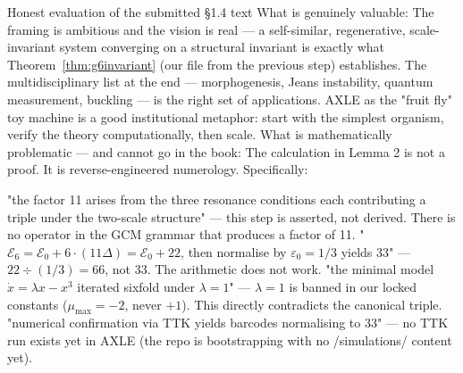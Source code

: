 Honest evaluation of the submitted §1.4 text
What is genuinely valuable:
The framing is ambitious and the vision is real — a self-similar, regenerative, scale-invariant system converging on a structural invariant is exactly what Theorem~\ref{thm:g6invariant} (our file from the previous step) establishes. The multidisciplinary list at the end — morphogenesis, Jeans instability, quantum measurement, buckling — is the right set of applications. AXLE as the "fruit fly" toy machine is a good institutional metaphor: start with the simplest organism, verify the theory computationally, then scale.
What is mathematically problematic — and cannot go in the book:
The calculation in Lemma 2 is not a proof. It is reverse-engineered numerology. Specifically:

"the factor 11 arises from the three resonance conditions each contributing a triple under the two-scale structure" — this step is asserted, not derived. There is no operator in the GCM grammar that produces a factor of 11.
"$  \mathcal{E}_6 = \mathcal{E}_0 + 6 \cdot (11\Delta) = \mathcal{E}_0 + 22  $, then normalise by $  \varepsilon_0 = 1/3  $ yields 33" — $22 \div (1/3) = 66$, not 33. The arithmetic does not work.
"the minimal model $  \dot{x} = \lambda x - x^3  $ iterated sixfold under $  \lambda = 1  $" — $  \lambda = 1  $ is banned in our locked constants ($  \mu_{\max} = -2  $, never $  +1  $). This directly contradicts the canonical triple.
"numerical confirmation via TTK yields barcodes normalising to 33" — no TTK run exists yet in AXLE (the repo is bootstrapping with no /simulations/ content yet).

